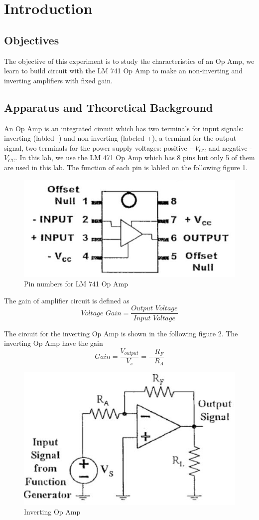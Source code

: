 \documentclass[12pt,a4paper]{article}
\begin{document}
\section{Introduction}
\subsection{Objectives}
  The objective of this experiment is to study the characteristics of an Op Amp, we learn to build circuit with the LM 741 Op Amp to make an non-inverting and inverting amplifiers with fixed gain.
\subsection{Apparatus and Theoretical Background}
An Op Amp is an integrated circuit which has two terminals for input signals: inverting (labled -) and non-inverting (labeled +), a terminal for the output signal, two terminals for the power supply voltages: positive +$V_{CC}$ and negative -$V_{CC}$. In this lab, we use the LM 471 Op Amp which has 8 pins but only 5 of them are used in this lab. The function of each pin is labled on the following figure 1.
  \begin{figure}[H]
  \centering
  \includegraphics[width=.6\textwidth]{Figure1.jpg}
  \caption{Pin numbers for LM 741 Op Amp}
  \label{img} 
\end{figure}

The gain of amplifier circuit is defined as 
$$\textit{Voltage Gain} = \frac{\textit{Output Voltage}}{\textit{Input Voltage}}$$

The circuit for the inverting Op Amp is shown in the following figure 2. The inverting Op Amp have the gain
$$Gain = \frac{V_{output}}{V_s}= -\frac{R_F}{R_A}$$
  \begin{figure}[H]
  \centering
  \includegraphics[width=.6\textwidth]{Figure2.jpg}
  \caption{Inverting Op Amp}
  \label{img} 
\end{figure}
\end{document}
